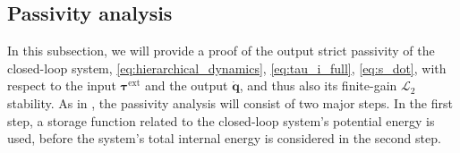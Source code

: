 \documentclass[../main.tex]{subfiles}
\begin{document}
\subsection{Passivity analysis} \label{ssec:passivity_analysis}
In this subsection, we will provide a proof of the output strict passivity of the closed-loop system, \eqref{eq:hierarchical_dynamics}, \eqref{eq:tau_i_full}, \eqref{eq:s_dot}, with respect to the input $\bm{\tau}^\mathrm{ext}$ and the output $\dot{\bm{q}}$, and thus also its finite-gain $\mathcal{L}_2$ stability.
As in \cite{dietrichPassiveHierarchicalImpedance2017}, the passivity analysis will consist of two major steps. In the first step, a storage function related to the closed-loop system's potential energy is used, before the system's total internal energy is considered in the second step.
\end{document}
